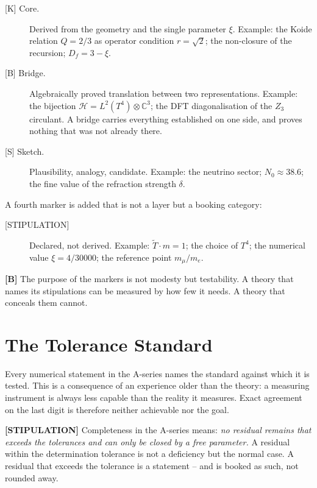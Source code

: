 \begin{description}
  \item[{[K]} Core.] Derived from the geometry and the single parameter $\xi$.
    Example: the Koide relation $Q = 2/3$ as operator condition $r = \sqrt{2}$;
    the non-closure of the recursion; $D_f = 3-\xi$.
  \item[{[B]} Bridge.] Algebraically proved translation between two
    representations. Example: the bijection $\mathcal{H} = L^2(T^4)\otimes
    \mathbb{C}^3$; the DFT diagonalisation of the $Z_3$ circulant. A bridge
    carries everything established on one side, and proves nothing that was
    not already there.
  \item[{[S]} Sketch.] Plausibility, analogy, candidate. Example: the
    neutrino sector; $N_0 \approx 38{.}6$; the fine value of the refraction
    strength $\delta$.
\end{description}

A fourth marker is added that is not a layer but a booking category:

\begin{description}
  \item[{[STIPULATION]}] Declared, not derived. Example: $\tilde T\cdot m = 1$;
    the choice of $T^4$; the numerical value $\xi = 4/30000$; the reference
    point $m_\mu/m_e$.
\end{description}

\textbf{[B]} The purpose of the markers is not modesty but testability. A
theory that names its stipulations can be measured by how few it needs. A
theory that conceals them cannot.

\section{The Tolerance Standard}

Every numerical statement in the A-series names the standard against which
it is tested. This is a consequence of an experience older than the theory:
a measuring instrument is always less capable than the reality it measures.
Exact agreement on the last digit is therefore neither achievable nor the goal.

\textbf{[STIPULATION]} Completeness in the A-series means: \emph{no residual
remains that exceeds the tolerances and can only be closed by a free parameter.}
A residual within the determination tolerance is not a deficiency but the
normal case. A residual that exceeds the tolerance is a statement -- and is
booked as such, not rounded away.


